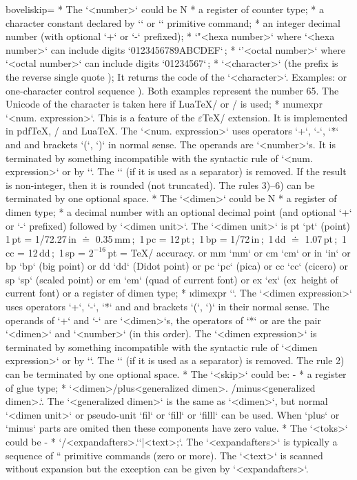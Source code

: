{\begitems \let\_aboveliskip=\relax 
* The `<number>` could be 
\begitems \style N
* a register of counter type;
* a character constant declared by \x`\chardef` or \x`\mathchardef` primitive command;
* an integer decimal number (with optional `+` or `-` prefixed);
* {\let\,=\relax `"<hexa number>`} where `<hexa number>` can include digits
  `0123456789ABCDEF`\,;
* {\let\,=\relax`'<octal number>`} where `<octal number>` can include digits 
  `01234567`\,;
* {\let\,=\relax {}`<character>`} (the prefix is the reverse single quote );
  It returns the code of the `<character>`. Examples:
   or one-character control sequence ).
  Both examples represent the number 65. The Unicode of the character 
  is taken here if Lua\TeX/ or \XeTeX/ is used;
* \i numexpr `\numexpr<num. expression>`.\fnote
  {This is a feature of the $\varepsilon$\TeX/ extension. It is implemented in pdf\TeX, \XeTeX/ and Lua\TeX.}
  The `<num. expression>` uses operators `+`, `-`, `*` and \code{/} and
  brackets `(`, `)` in normal sense. The operands are `<number>`s. It
  is terminated by something incompatible with
  the syntactic rule of `<num. expression>` or by `\relax`.
  The `\relax` (if it is used as a separator) is removed.
  If the result is non-integer, then it is rounded (not truncated).
\enditems
  The rules 3)--6) can be terminated by one optional space.
* The `<dimen>` could be
\begitems \style N
* a register of dimen type;
* a decimal number with an optional decimal point (and optional `+` or `-`
  prefixed) followed by `<dimen unit>`. The `<dimen unit>` is \ii pt `pt` (point)\fnote 
  {1\,pt = 1/72.27\,in $\doteq$ 0.35\,mm\,;\ 1\,pc = 12\,pt\,;\
   1\,bp = 1/72\,in\,;\ 1\,dd $\doteq$ 1.07\,pt\,;\ 1\,cc = 12\,dd\,;\
   1\,sp = $2^{-16}$\,pt = \TeX/ accuracy.}
  or \ii mm `mm` or \ii cm `cm` or \ii in `in` or 
  \ii bp `bp` (big point) or \ii dd `dd` (Didot point) or \ii pc `pc` (pica) or 
  \ii cc `cc` (cicero) or \ii sp `sp` (scaled point) or \ii em `em` (quad of current font) or
  \ii ex `ex` (ex~height of current font) or a register of dimen type;  
* \i dimexpr `\dimexpr<dimen expression>`.
  The `<dimen expression>` uses operators `+`, `-`, `*` and \code{/} and
  brackets `(`, `)` in their normal sense. The operands of `+` and `-` are
  `<dimen>`s, the operators of `*` or \code{/} are the pair `<dimen>` and
  `<number>` (in this order). The `<dimen expression>`
  is terminated by something incompatible with the
  syntactic rule of `<dimen expression>` or by `\relax`. The `\relax` (if it
  is used as a separator) is removed.
\enditems
  The rule 2) can be terminated by one optional space.
* The `<skip>` could be:
\begitems \style -
* a register of glue type;
* `<dimen>/plus<generalized dimen>. /minus<generalized dimen>.`. The 
  `<generalized dimen>` is the same as `<dimen>`, but normal `<dimen unit>` 
   or pseudo-unit `fil` or `fill` or `filll` can be used.
   When `plus` or `minus` parts are omited then these components have zero
   value.
\enditems
* The `<toks>` could be
\begitems \style -
* `/<expandafters>.`\z`{|<text>};`. The `<expandafters>` is typically a sequence of
  `\expandafter` primitive commands (zero or more). The \z`<text>` is
  scanned without expansion but the exception can be given by 
  `<expandafters>`.
\enditems
\enditems

}
